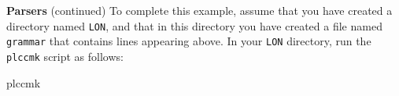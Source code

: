 \begin{minipage}[t]{\sw}
\slidenumber
\LARGE
{\bf Parsers} (continued)\exx
\emm{\Large\LightBox{\MYlonGrammar}}\exx
To complete this example, 
assume that you have created a directory named \verb'LON',
and that in this directory you have created a file named \verb'grammar'
that contains lines appearing above.
In your \verb'LON' directory,
run the \verb'plccmk' script as follows:
\begin{qv}
plccmk
\end{qv}
\end{minipage}
\clearpage
